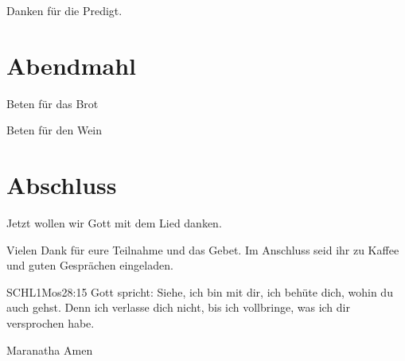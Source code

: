 Danken für die Predigt.

\section{Abendmahl}

Beten für das Brot


Beten für den Wein



\section{Abschluss}

Jetzt wollen wir Gott mit dem Lied  danken.


Vielen Dank für eure Teilnahme und das Gebet. Im Anschluss seid ihr zu Kaffee und guten Gesprächen eingeladen.
\beten{}

\begin{bibelbox}{SCHL}{1Mos}{28:15}
Gott spricht: Siehe, ich bin mit dir,
ich behüte dich, wohin du auch gehst.
Denn ich verlasse dich nicht,
bis ich vollbringe, was ich dir versprochen habe.
\end{bibelbox}

Maranatha Amen
